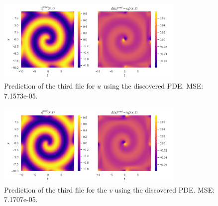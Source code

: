 \documentclass[unicode,11pt,a4paper,oneside,numbers=endperiod,openany]{scrartcl}
\begin{document}
\begin{figure}[h!]\label{fig:results_u_3}
    \centering
    \includegraphics[width=0.8\textwidth]{../Task2/figures/results_u_3.png}
    \caption{Prediction of the third file for $u$ using the discovered PDE. MSE: 7.1573e-05.}
\end{figure}
\begin{figure}[h!]\label{fig:results_v_3}
    \centering
    \includegraphics[width=0.8\textwidth]{../Task2/figures/results_v_3.png}
    \caption{Prediction of the third file for the $v$ using the discovered PDE. MSE: 7.1707e-05.}
\end{figure}

\newpage
\end{document}

